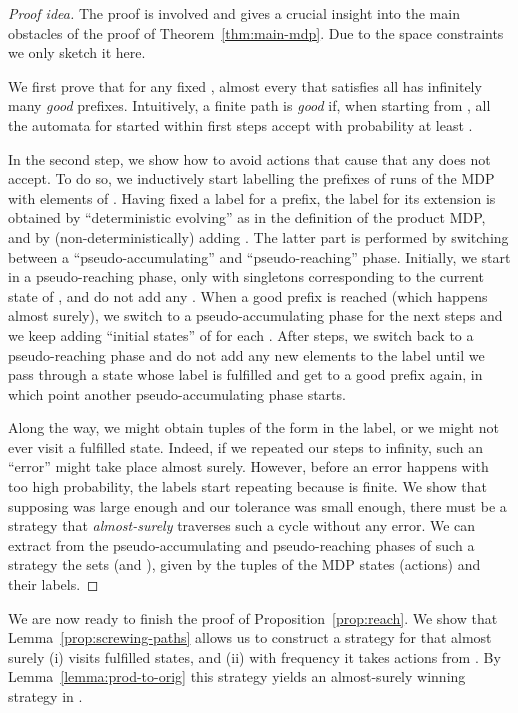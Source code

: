 \documentclass[a4paper,UKenglish]{lipics}
\begin{document}
\begin{proof}[Proof idea]
	The proof is involved and gives a crucial insight into the main obstacles of the proof of Theorem~\ref{thm:main-mdp}.
	Due to the space constraints we only sketch it here.
	
	We first prove that for any fixed , almost every  that satisfies all  has infinitely many {\em good} prefixes. Intuitively, a finite path  is \emph{good} if, when starting from ,
	all the automata  for  started within  first steps accept with probability at least .
	
	In the second step, we show how to avoid actions that cause that any  does not accept.
To do so, we inductively start labelling the prefixes of runs of the MDP with elements of . Having fixed a label for a prefix, the label for its extension is obtained by ``deterministic evolving'' as in the definition of the product MDP, and by (non-deterministically) adding .
	The latter part is performed by switching between a ``pseudo-accumulating'' and ``pseudo-reaching'' phase. Initially, we start in a pseudo-reaching phase, only with singletons corresponding to the current state of , and do not add any . When a good prefix is reached (which happens almost surely), we switch to a pseudo-accumulating phase for the next  steps and we keep adding ``initial states''  of  for each . After  steps, we switch back to a pseudo-reaching phase and do not add any new elements to the label until we pass through a state whose label is fulfilled and get to a good prefix again, in which point another pseudo-accumulating phase starts.
	
	Along the way, we might obtain tuples of the form  in the label, or we might not ever visit a fulfilled state. Indeed, if we repeated our steps to infinity, such an ``error'' might take place almost surely. However, before an error happens with too high probability, the labels start repeating because  is finite. 
We show that supposing  was large enough and our tolerance  was small enough, there must be a strategy that \emph{almost-surely} traverses such a cycle without any error.
We can extract from the pseudo-accumulating and pseudo-reaching phases of such a strategy the sets  (and ), given by the tuples of the MDP states (actions) and their labels.
\end{proof}

We are now ready to finish the proof of Proposition~\ref{prop:reach}. We show that Lemma~\ref{prop:screwing-paths} allows us to
construct a strategy  for  that almost surely (i) visits fulfilled states, and (ii) with frequency  it takes actions from . By Lemma~\ref{lemma:prod-to-orig} this strategy yields an almost-surely winning strategy  in .
\end{document}

